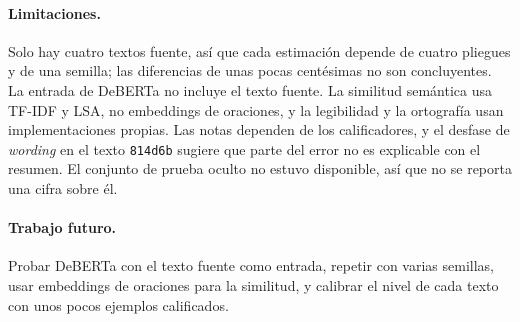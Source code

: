 \documentclass[11pt,a4paper]{article}
\begin{document}
\paragraph{Limitaciones.} Solo hay cuatro textos fuente, así que cada estimación depende de cuatro pliegues y de una semilla; las diferencias de unas pocas centésimas no son concluyentes. La entrada de DeBERTa no incluye el texto fuente. La similitud semántica usa TF-IDF y LSA, no embeddings de oraciones, y la legibilidad y la ortografía usan implementaciones propias. Las notas dependen de los calificadores, y el desfase de \emph{wording} en el texto \texttt{814d6b} sugiere que parte del error no es explicable con el resumen. El conjunto de prueba oculto no estuvo disponible, así que no se reporta una cifra sobre él.

\paragraph{Trabajo futuro.} Probar DeBERTa con el texto fuente como entrada, repetir con varias semillas, usar embeddings de oraciones para la similitud, y calibrar el nivel de cada texto con unos pocos ejemplos calificados.
\end{document}
